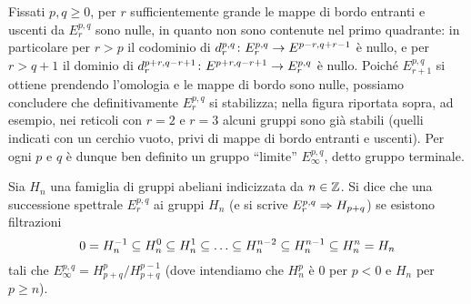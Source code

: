 Fissati \(p,q\ge 0\), per \(r\) sufficientemente grande le mappe di bordo entranti e uscenti da \(E^{p,q}_r\) sono nulle, in quanto non sono contenute nel primo quadrante: in particolare per \(r>p\) il codominio di \(\map{d^{p,q}_r}{E^{p,q}_r}{E^{p-r,q+r-1}}\) è nullo, e per \(r>q+1\) il dominio di \(\map{d^{p+r,q-r+1}_r}{E^{p+r,q-r+1}}{E^{p,q}_r}\) è nullo. Poiché \(E^{p,q}_{r+1}\) si ottiene prendendo l'omologia e le mappe di bordo sono nulle, possiamo concludere che definitivamente \(E^{p,q}_r\) si stabilizza; nella figura riportata sopra, ad esempio, nei reticoli con \(r=2\) e \(r=3\) alcuni gruppi sono già stabili (quelli indicati con un cerchio vuoto, privi di mappe di bordo entranti e uscenti). Per ogni \(p\) e \(q\) è dunque ben definito un gruppo \enquote{limite} \(E^{p,q}_\infty\), detto gruppo terminale. 

\begin{definition}
Sia \(H_n\) una famiglia di gruppi abeliani indicizzata da \(n\in\mathbb{Z}\). Si dice che una successione spettrale \(E^{p,q}_r\)  ai gruppi \(H_n\) (e si scrive \(E^{p,q}_r\Rightarrow H_{p+q}\)) se esistono filtrazioni
\[
0=H^{-1}_n\subseteq H^0_n\subseteq H^1_n\subseteq\ldots\subseteq H^{n-2}_n\subseteq H^{n-1}_n\subseteq H^n_n=H_n
\]
tali che \(E^{p,q}_\infty=H^p_{p+q}/H^{p-1}_{p+q}\) (dove intendiamo che \(H^p_n\) è \(0\) per \(p<0\) e \(H_n\) per \(p\ge n\)).
\end{definition}

